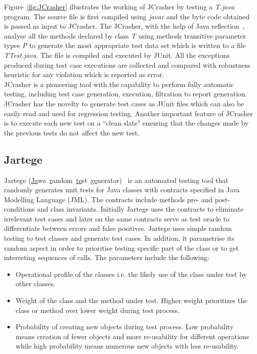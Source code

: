 Figure~\ref{fig:JCrasher} illustrates the working of JCrasher by testing a {\it T.java} program. The source file is first compiled using {\it javac} and the byte code obtained is passed as input to JCrasher. The JCrasher, with the help of Java reflection~\cite{chan1999java}, analyse all the methods declared by class {\it T} using methods transitive parameter types { \it P} to generate the most appropriate test data set which is written to a file {\it TTest.java}. The file is compiled and executed by JUnit. All the exceptions produced during test case executions are collected and compared with robustness heuristic for any violation which is reported as error.\\

\noindent JCrasher is a pioneering tool with the capability to perform fully automatic testing, including test case generation, execution, filtration to report generation. JCrasher has the novelty to generate test cases as JUnit files which can also be easily read and used for regression testing. Another important feature of JCrasher is to execute each new test on a ``clean slate" ensuring that the changes made by the previous tests do not affect the new test.  



\subsection{Jartege}
Jartege (\uline{Ja}wa~\uline{r}andom~\uline{te}st~\uline{ge}nerator)~\cite{Oriat2004} is an automated testing tool that randomly generates unit tests for Java classes with contracts specified in Java Modelling Language (JML). The contracts include methods pre- and post-conditions and class invariants. Initially Jartege uses the contracts to eliminate irrelevant test cases and later on the same contracts serve as test oracle to differentiate between errors and false positives. Jartege uses simple random testing to test classes and generate test cases. In addition, it parametrise its random aspect in order to prioritise testing specific part of the class or to get interesting sequences of calls. The parameters include the following: 
\begin{itemize}
\item Operational profile of the classes i.e. the likely use of the class under test by other classes.  
\item Weight of the class and the method under test. Higher weight prioritizes the class or method over lower weight during test process. 
\item Probability of creating new objects during test process. Low probability means creation of fewer objects and more re-usability for different operations while high probability means numerous new objects with less re-usability.
\end{itemize}

